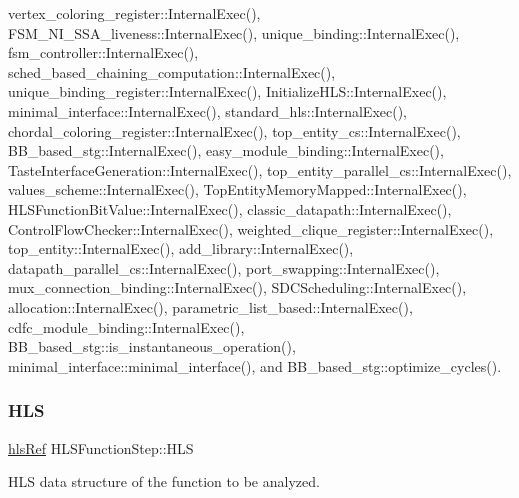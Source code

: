 vertex\+\_\+coloring\+\_\+register\+::\+Internal\+Exec(), F\+S\+M\+\_\+\+N\+I\+\_\+\+S\+S\+A\+\_\+liveness\+::\+Internal\+Exec(), unique\+\_\+binding\+::\+Internal\+Exec(), fsm\+\_\+controller\+::\+Internal\+Exec(), sched\+\_\+based\+\_\+chaining\+\_\+computation\+::\+Internal\+Exec(), unique\+\_\+binding\+\_\+register\+::\+Internal\+Exec(), Initialize\+H\+L\+S\+::\+Internal\+Exec(), minimal\+\_\+interface\+::\+Internal\+Exec(), standard\+\_\+hls\+::\+Internal\+Exec(), chordal\+\_\+coloring\+\_\+register\+::\+Internal\+Exec(), top\+\_\+entity\+\_\+cs\+::\+Internal\+Exec(), B\+B\+\_\+based\+\_\+stg\+::\+Internal\+Exec(), easy\+\_\+module\+\_\+binding\+::\+Internal\+Exec(), Taste\+Interface\+Generation\+::\+Internal\+Exec(), top\+\_\+entity\+\_\+parallel\+\_\+cs\+::\+Internal\+Exec(), values\+\_\+scheme\+::\+Internal\+Exec(), Top\+Entity\+Memory\+Mapped\+::\+Internal\+Exec(), H\+L\+S\+Function\+Bit\+Value\+::\+Internal\+Exec(), classic\+\_\+datapath\+::\+Internal\+Exec(), Control\+Flow\+Checker\+::\+Internal\+Exec(), weighted\+\_\+clique\+\_\+register\+::\+Internal\+Exec(), top\+\_\+entity\+::\+Internal\+Exec(), add\+\_\+library\+::\+Internal\+Exec(), datapath\+\_\+parallel\+\_\+cs\+::\+Internal\+Exec(), port\+\_\+swapping\+::\+Internal\+Exec(), mux\+\_\+connection\+\_\+binding\+::\+Internal\+Exec(), S\+D\+C\+Scheduling\+::\+Internal\+Exec(), allocation\+::\+Internal\+Exec(), parametric\+\_\+list\+\_\+based\+::\+Internal\+Exec(), cdfc\+\_\+module\+\_\+binding\+::\+Internal\+Exec(), B\+B\+\_\+based\+\_\+stg\+::is\+\_\+instantaneous\+\_\+operation(), minimal\+\_\+interface\+::minimal\+\_\+interface(), and B\+B\+\_\+based\+\_\+stg\+::optimize\+\_\+cycles().

\mbox{\label{classHLSFunctionStep_a1012ab6dc28ce9a560f0784455a89c56}} 
\subsubsection{\texorpdfstring{H\+LS}{HLS}}
{\footnotesize\ttfamily \hyperlink{hls_8hpp_a75d0c73923d0ddfa28c4843a802c73a7}{hls\+Ref} H\+L\+S\+Function\+Step\+::\+H\+LS\hspace{0.3cm}{\ttfamily [protected]}}



H\+LS data structure of the function to be analyzed. 



